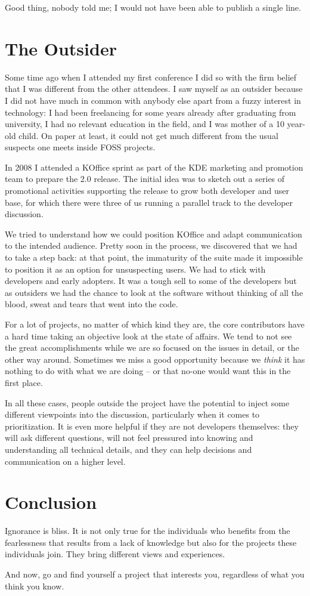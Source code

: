 Good thing, nobody told me; I would not have been able to publish a single line.

\section*{The Outsider}

Some time ago when I attended my first conference I did so with the firm belief
that I was different from the other attendees. I saw myself as an outsider
because I did not have much in common with anybody else apart from a fuzzy
interest in technology: I had been freelancing for some years already after
graduating from university, I had no relevant education in the field, and I was
mother of a 10 year-old child. On paper at least, it could not get much
different from the usual suspects one meets inside FOSS projects.

In 2008 I attended a KOffice sprint as part of the KDE marketing and promotion
team to prepare the 2.0 release. The initial idea was to sketch out a series of
promotional activities supporting the release to grow both developer and user
base, for which there were three of us running a parallel track to the developer
discussion.

We tried to understand how we could position KOffice and adapt communication to
the intended audience. Pretty soon in the process, we discovered that we had to
take a step back: at that point, the immaturity of the suite made it impossible
to position it as an option for unsuspecting users. We had to stick with
developers and early adopters. It was a tough sell to some of the developers but
as outsiders we had the chance to look at the software without thinking of all
the blood, sweat and tears that went into the code.

For a lot of projects, no matter of which kind they are, the core contributors
have a hard time taking an objective look at the state of affairs. We tend to
not see the great accomplishments while we are so focused on the issues in
detail, or the other way around. Sometimes we miss a good opportunity because we
\textit{think} it has nothing to do with what we are doing -- or that no-one
would want this in the first place.

In all these cases, people outside the project have the potential to inject some
different viewpoints into the discussion, particularly when it comes to
prioritization. It is even more helpful if they are not developers themselves:
they will ask different questions, will not feel pressured into knowing and
understanding all technical details, and they can help decisions and
communication on a higher level.

\section*{Conclusion}

Ignorance is bliss. It is not only true for the individuals who benefits from
the fearlessness that results from a lack of knowledge but also for the projects
these individuals join. They bring different views and experiences.

And now, go and find yourself a project that interests you, regardless of what
you think you know.
